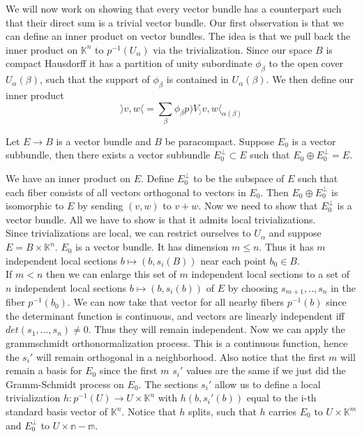 \documentclass[../Thesis.tex]{subfiles}
\begin{document}
We will now work on showing that every vector bundle has a counterpart such that their direct sum is a trivial vector bundle. Our first observation is that we can define an inner product on vector bundles. The idea is that we pull back the inner product on $\mathbb{K}^n$ to $p^{-1}(U_\alpha)$ via the trivialization. Since our space $B$ is compact Hausdorff it has a partition of unity subordinate $\phi_\beta$ to the open cover $U_\alpha(\beta)$, such that  the support of $\phi_\beta$ is contained in $U_\alpha(\beta)$. We then define our inner product 
\begin{equation}
\rangle v, w \langle = \sum_\beta \phi_\beta p)V_\rangle v, w \langle_{\alpha(\beta)}
\end{equation}
\begin{lemma}
Let $E \rightarrow B$ is a vector bundle and $B$ be paracompact. Suppose $E_0$ is a vector subbundle, then there exists a vector subbundle $E_0^\perp \subset E$ such that $E_0 \oplus E_0^\perp = E$.
\end{lemma}
\begin{myproof}
We have an inner product on $E$. Define $E_0^\perp$ to be the subspace of $E$ such that each fiber consists of all vectors orthogonal to vectors in $E_0$. Then $E_0 \oplus E_0^\perp$ is isomorphic to $E$ by sending $(v,w)$ to $v + w$. Now we need to show that $E_0^\perp$ is a vector bundle. All we have to show is that it admits local trivializations.
\\Since trivializations are local, we can restrict ourselves to $U_\alpha$ and suppose $E = B \times \mathbb{K}^n$. $E_0$ is a vector bundle. It has dimension $m \leq n$. Thus it has $m$ independent local sections $b \mapsto (b, s_i(B))$ near each point $b_0 \in B$. 
\\If $m < n$ then we can enlarge this set of $m$ independent local sections to a set of $n$ independent local sections $b \mapsto (b, s_i(b))$ of $E$ by choosing $s_{m+1}, .., s_n$ in the fiber $p^{-1}(b_0)$. We can now take that vector for all nearby fibers $p^{-1}(b)$ since the determinant function is continuous, and vectors are linearly independent iff $det(s_1, ..., s_n) \neq 0$. Thus they will remain independent. Now we can apply the grammschmidt orthonormalization process. This is a continuous function, hence the $s_i'$ will remain orthogonal in a neighborhood. Also notice that the first $m$ will remain a basis for $E_0$ since the first $m$ $s_i'$ values are the same if we just did the Gramm-Schmidt process on $E_0$. The sections $s_i'$ allow us to define a local trivialization $h:p^{-1}(U) \rightarrow U \times \mathbb{K}^n$ with $h(b,s_i'(b))$ equal to the i-th standard basis vector of $\mathbb{K}^n$. Notice that $h$ splits, such that $h$ carries $E_0$ to $U \times \mathbb{K}^m$ and $E_0^\perp$ to $U \times \mathbb{n-m}$.
\end{myproof}
\end{document}

